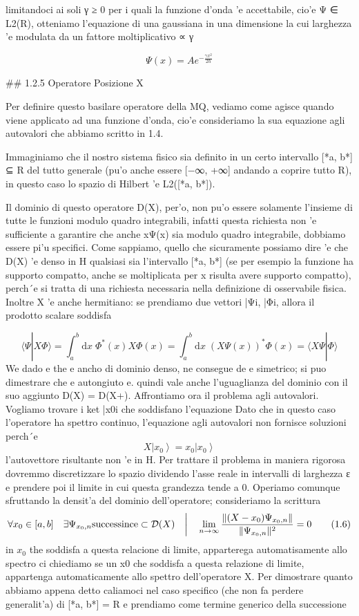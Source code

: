 {	limitandoci ai soli γ ≥ 0 per i quali la funzione d'onda 'e accettabile, cio'e Ψ ∈ L2(R), otteniamo l'equazione di una gaussiana in una dimensione la cui larghezza 'e modulata da un fattore moltiplicativo ∝ γ
	
	$$\Psi(x)=A e^{-{\frac{\gamma x^{2}}{2\hbar}}}$$
	
	## 1.2.5 Operatore Posizione X
	
	Per definire questo basilare operatore della MQ, vediamo come agisce quando viene applicato ad una funzione d'onda, cio'e consideriamo la sua equazione agli autovalori che abbiamo scritto in 1.4.
	
	Immaginiamo che il nostro sistema fisico sia definito in un certo intervallo [*a, b*] ⊆ R del tutto generale (pu'o anche essere [−∞, +∞] andando a coprire tutto R), in questo caso lo spazio di Hilbert 'e L2([*a, b*]).
	
	Il dominio di questo operatore D(X), per'o, non pu'o essere solamente l'insieme di tutte le funzioni modulo quadro integrabili, infatti questa richiesta non 'e sufficiente a garantire che anche xΨ(x) sia modulo quadro integrabile, dobbiamo essere pi'u specifici. Come sappiamo, quello che sicuramente possiamo dire 'e che D(X) 'e denso in H qualsiasi sia l'intervallo [*a, b*] (se per esempio la funzione ha supporto compatto, anche se moltiplicata per x risulta avere supporto compatto), perch´e si tratta di una richiesta necessaria nella definizione di osservabile fisica. Inoltre X 'e anche hermitiano: se prendiamo due vettori |Ψi, |Φi, allora il prodotto scalare soddisfa
	
	$$\langle\Psi|X\Phi\rangle=\int_{a}^{b}\mathrm{d}x\;\Phi^{*}(x)X\Phi(x)=\int_{a}^{b}\mathrm{d}x\;(X\Psi(x))^{*}\Phi(x)=\langle X\Psi|\Phi\rangle$$  We dado e the e ancho di dominio denso, ne consegue de e simetrico; si puo dimestrare che e autongiuto e.  
	quindi vale anche l'uguaglianza del dominio con il suo aggiunto D(X) = D(X+).
	Affrontiamo ora il problema agli autovalori. Vogliamo trovare i ket |x0i che soddisfano l'equazione
	Dato che in questo caso l'operatore ha spettro continuo, l'equazione agli autovalori non fornisce soluzioni perch´e
	$$X\left|x_{0}\right\rangle=x_{0}\left|x_{0}\right\rangle$$
	l'autovettore risultante non 'e in H. Per trattare il problema in maniera rigorosa dovremmo discretizzare lo
	spazio dividendo l'asse reale in intervalli di larghezza ε e prendere poi il limite in cui questa grandezza tende a 0.
	Operiamo comunque sfruttando la densit'a del dominio dell'operatore; consideriamo la scrittura
	$$\forall x_{0}\in[a,b]\quad\exists\Psi_{x_{0},n}\text{successince}\subset\mathcal{D}(X)\quad\bigg{|}\quad\lim_{n\to\infty}\frac{\|(X-x_{0})\Psi_{x_{0},n}\|}{\|\Psi_{x_{0},n}\|^{2}}=0\tag{1.6}$$  in $x_{0}$ the soddisfa a questa relacione di limite, apparterega automatisamente allo spectro
	ci chiediamo se un x0 che soddisfa a questa relazione di limite, appartenga automaticamente allo spettro dell'operatore X. Per dimostrare quanto abbiamo appena detto caliamoci nel caso specifico (che non fa perdere generalit'a) di [*a, b*] = R e prendiamo come termine generico della successione
	
}
